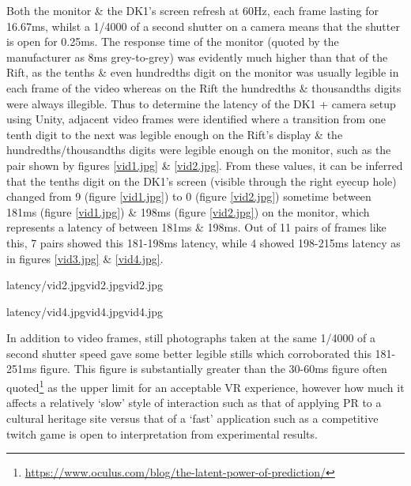 Both the monitor \& the DK1's screen refresh at 60Hz, each frame lasting for 16.67ms, whilst a 1/4000 of a second shutter on a camera means that the shutter is open for 0.25ms. The response time of the monitor (quoted by the manufacturer as 8ms grey-to-grey) was evidently much higher than that of the Rift, as the tenths \& even hundredths digit on the monitor was usually legible in each frame of the video whereas on the Rift the hundredths \& thousandths digits were always illegible. Thus to determine the latency of the DK1 + camera setup using Unity, adjacent video frames were identified where a transition from one tenth digit to the next was legible enough on the Rift's display \& the hundredths/thousandths digits were legible enough on the monitor, such as the pair shown by figures \ref{vid1.jpg} \& \ref{vid2.jpg}. From these values, it can be inferred that the tenths digit on the DK1's screen (visible through the right eyecup hole) changed from 9 (figure \ref{vid1.jpg}) to 0 (figure \ref{vid2.jpg}) sometime between 181ms (figure \ref{vid1.jpg}) \& 198ms (figure \ref{vid2.jpg}) on the monitor, which represents a latency of between 181ms \& 198ms. Out of 11 pairs of frames like this, 7 pairs showed this 181-198ms latency, while 4 showed 198-215ms latency as in figures \ref{vid3.jpg} \& \ref{vid4.jpg}.

       {latency/vid2.jpg}{vid2.jpg}{vid2.jpg}

       {latency/vid4.jpg}{vid4.jpg}{vid4.jpg}

In addition to video frames, still photographs taken at the same 1/4000 of a second shutter speed gave some better legible stills which corroborated this 181-251ms figure. This figure is substantially greater than the 30-60ms figure often quoted\footnote{\url{https://www.oculus.com/blog/the-latent-power-of-prediction/}} as the upper limit for an acceptable VR experience, however how much it affects a relatively `slow' style of interaction such as that of applying PR to a cultural heritage site versus that of a `fast' application such as a competitive twitch game is open to interpretation from experimental results.

